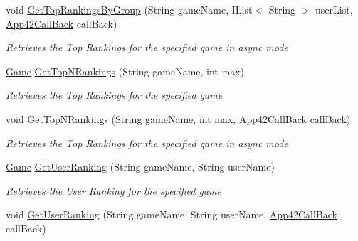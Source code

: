 \begin{DoxyCompactItemize}
void \hyperlink{classcom_1_1shephertz_1_1app42_1_1paas_1_1sdk_1_1csharp_1_1game_1_1_score_board_service_a83fc7b00490edf82ad2274a342d3576d}{Get\+Top\+Rankings\+By\+Group} (String game\+Name, I\+List$<$ String $>$ user\+List, \hyperlink{interfacecom_1_1shephertz_1_1app42_1_1paas_1_1sdk_1_1csharp_1_1_app42_call_back}{App42\+Call\+Back} call\+Back)
\begin{DoxyCompactList}\small\item\em Retrieves the Top Rankings for the specified game in async mode \end{DoxyCompactList}\item 
\hyperlink{classcom_1_1shephertz_1_1app42_1_1paas_1_1sdk_1_1csharp_1_1game_1_1_game}{Game} \hyperlink{classcom_1_1shephertz_1_1app42_1_1paas_1_1sdk_1_1csharp_1_1game_1_1_score_board_service_a78686ffdade173da65a346de47b3de5b}{Get\+Top\+N\+Rankings} (String game\+Name, int max)
\begin{DoxyCompactList}\small\item\em Retrieves the Top Rankings for the specified game \end{DoxyCompactList}\item 
void \hyperlink{classcom_1_1shephertz_1_1app42_1_1paas_1_1sdk_1_1csharp_1_1game_1_1_score_board_service_aa10fc1010cc848c38ac9ea14fb81b233}{Get\+Top\+N\+Rankings} (String game\+Name, int max, \hyperlink{interfacecom_1_1shephertz_1_1app42_1_1paas_1_1sdk_1_1csharp_1_1_app42_call_back}{App42\+Call\+Back} call\+Back)
\begin{DoxyCompactList}\small\item\em Retrieves the Top Rankings for the specified game in async mode \end{DoxyCompactList}\item 
\hyperlink{classcom_1_1shephertz_1_1app42_1_1paas_1_1sdk_1_1csharp_1_1game_1_1_game}{Game} \hyperlink{classcom_1_1shephertz_1_1app42_1_1paas_1_1sdk_1_1csharp_1_1game_1_1_score_board_service_a0b1dcb490b5c663483ada855df55dc32}{Get\+User\+Ranking} (String game\+Name, String user\+Name)
\begin{DoxyCompactList}\small\item\em Retrieves the User Ranking for the specified game \end{DoxyCompactList}\item 
void \hyperlink{classcom_1_1shephertz_1_1app42_1_1paas_1_1sdk_1_1csharp_1_1game_1_1_score_board_service_a98b0e5d7cb54987a185b654bbaa1101a}{Get\+User\+Ranking} (String game\+Name, String user\+Name, \hyperlink{interfacecom_1_1shephertz_1_1app42_1_1paas_1_1sdk_1_1csharp_1_1_app42_call_back}{App42\+Call\+Back} call\+Back)

\end{DoxyCompactItemize}
